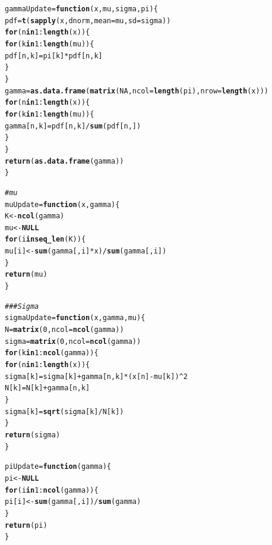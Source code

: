 \documentclass{article}\usepackage[]{graphicx}\usepackage[]{color}
\makeatletter
\newcommand{\hlnum}[1]{\textcolor[rgb]{0.686,0.059,0.569}{#1}}%
\newcommand{\hlcom}[1]{\textcolor[rgb]{0.678,0.584,0.686}{\textit{#1}}}%
\newcommand{\hlopt}[1]{\textcolor[rgb]{0,0,0}{#1}}%
\newcommand{\hlstd}[1]{\textcolor[rgb]{0.345,0.345,0.345}{#1}}%
\newcommand{\hlkwa}[1]{\textcolor[rgb]{0.161,0.373,0.58}{\textbf{#1}}}%
\newcommand{\hlkwb}[1]{\textcolor[rgb]{0.69,0.353,0.396}{#1}}%
\newcommand{\hlkwc}[1]{\textcolor[rgb]{0.333,0.667,0.333}{#1}}%
\newcommand{\hlkwd}[1]{\textcolor[rgb]{0.737,0.353,0.396}{\textbf{#1}}}%
\newenvironment{kframe}{%
 \def\at@end@of@kframe{}%
 \ifinner\ifhmode%
  \def\at@end@of@kframe{\end{minipage}}%
  \begin{minipage}{\columnwidth}%
 \fi\fi%
 \def\FrameCommand##1{\hskip\@totalleftmargin \hskip-\fboxsep
 \colorbox{shadecolor}{##1}\hskip-\fboxsep
     \hskip-\linewidth \hskip-\@totalleftmargin \hskip\columnwidth}%
 \MakeFramed {\advance\hsize-\width
   \@totalleftmargin\z@ \linewidth\hsize
   \@setminipage}}%
 {\par\unskip\endMakeFramed%
 \at@end@of@kframe}
\newenvironment{knitrout}{}{} %
\makeatother
\begin{document}
\begin{knitrout}
\begin{kframe}
\begin{alltt}
\hlstd{gammaUpdate} \hlkwb{=} \hlkwa{function}\hlstd{(}\hlkwc{x}\hlstd{,} \hlkwc{mu}\hlstd{,} \hlkwc{sigma}\hlstd{,} \hlkwc{pi}\hlstd{)\{}
  \hlstd{pdf} \hlkwb{=} \hlkwd{t}\hlstd{(}\hlkwd{sapply}\hlstd{(x, dnorm,} \hlkwc{mean} \hlstd{= mu,} \hlkwc{sd} \hlstd{= sigma))}
  \hlkwa{for}\hlstd{(n} \hlkwa{in} \hlnum{1}\hlopt{:}\hlkwd{length}\hlstd{(x))\{}
    \hlkwa{for}\hlstd{(k} \hlkwa{in} \hlnum{1}\hlopt{:}\hlkwd{length}\hlstd{(mu))\{}
      \hlstd{pdf[n, k]} \hlkwb{=} \hlstd{pi[k]}\hlopt{*}\hlstd{pdf[n, k]}
    \hlstd{\}}
  \hlstd{\}}
  \hlstd{gamma} \hlkwb{=} \hlkwd{as.data.frame}\hlstd{(}\hlkwd{matrix}\hlstd{(}\hlnum{NA}\hlstd{,} \hlkwc{ncol} \hlstd{=} \hlkwd{length}\hlstd{(pi),} \hlkwc{nrow} \hlstd{=} \hlkwd{length}\hlstd{(x)))}
  \hlkwa{for}\hlstd{(n} \hlkwa{in} \hlnum{1}\hlopt{:}\hlkwd{length}\hlstd{(x))\{}
    \hlkwa{for}\hlstd{(k} \hlkwa{in} \hlnum{1}\hlopt{:}\hlkwd{length}\hlstd{(mu))\{}
      \hlstd{gamma[n, k]} \hlkwb{=} \hlstd{pdf[n, k]}\hlopt{/}\hlkwd{sum}\hlstd{(pdf[n,])}
    \hlstd{\}}
  \hlstd{\}}
  \hlkwd{return}\hlstd{(}\hlkwd{as.data.frame}\hlstd{(gamma))}
\hlstd{\}}

\hlcom{# mu}
\hlstd{muUpdate} \hlkwb{=} \hlkwa{function}\hlstd{(}\hlkwc{x}\hlstd{,} \hlkwc{gamma}\hlstd{)\{}
  \hlstd{K} \hlkwb{<-} \hlkwd{ncol}\hlstd{(gamma)}
  \hlstd{mu} \hlkwb{<-} \hlkwa{NULL}
  \hlkwa{for} \hlstd{(i} \hlkwa{in} \hlkwd{seq_len}\hlstd{(K)) \{}
    \hlstd{mu[i]} \hlkwb{<-} \hlkwd{sum}\hlstd{(gamma[,i]}\hlopt{*}\hlstd{x)}\hlopt{/}\hlkwd{sum}\hlstd{(gamma[,i])}
  \hlstd{\}}
  \hlkwd{return}\hlstd{(mu)}
\hlstd{\}}


\hlcom{### Sigma}
\hlstd{sigmaUpdate} \hlkwb{=} \hlkwa{function}\hlstd{(}\hlkwc{x}\hlstd{,} \hlkwc{gamma}\hlstd{,} \hlkwc{mu}\hlstd{)\{}
  \hlstd{N} \hlkwb{=} \hlkwd{matrix}\hlstd{(}\hlnum{0}\hlstd{,} \hlkwc{ncol}\hlstd{=} \hlkwd{ncol}\hlstd{(gamma))}
  \hlstd{sigma} \hlkwb{=} \hlkwd{matrix}\hlstd{(}\hlnum{0}\hlstd{,} \hlkwc{ncol} \hlstd{=} \hlkwd{ncol}\hlstd{(gamma))}
  \hlkwa{for}\hlstd{(k} \hlkwa{in} \hlnum{1}\hlopt{:}\hlkwd{ncol}\hlstd{(gamma))\{}
    \hlkwa{for}\hlstd{(n} \hlkwa{in} \hlnum{1}\hlopt{:}\hlkwd{length}\hlstd{(x))\{}
      \hlstd{sigma[k]} \hlkwb{=} \hlstd{sigma[k]} \hlopt{+} \hlstd{gamma[n,k]}\hlopt{*}\hlstd{(x[n]}\hlopt{-}\hlstd{mu[k])}\hlopt{^}\hlnum{2}
      \hlstd{N[k]} \hlkwb{=} \hlstd{N[k]} \hlopt{+} \hlstd{gamma[n,k]}
    \hlstd{\}}
    \hlstd{sigma[k]} \hlkwb{=} \hlkwd{sqrt}\hlstd{(sigma[k]}\hlopt{/}\hlstd{N[k])}
  \hlstd{\}}
  \hlkwd{return}\hlstd{(sigma)}
\hlstd{\}}

\hlstd{piUpdate} \hlkwb{=} \hlkwa{function}\hlstd{(}\hlkwc{gamma}\hlstd{)\{}
  \hlstd{pi} \hlkwb{<-} \hlkwa{NULL}
  \hlkwa{for} \hlstd{(i} \hlkwa{in} \hlnum{1}\hlopt{:}\hlkwd{ncol}\hlstd{(gamma)) \{}
    \hlstd{pi[i]} \hlkwb{<-} \hlkwd{sum}\hlstd{(gamma[,i])}\hlopt{/}\hlkwd{sum}\hlstd{(gamma)}
  \hlstd{\}}
  \hlkwd{return}\hlstd{(pi)}
\hlstd{\}}


\end{alltt}
\end{kframe}
\end{knitrout}
\end{document}
